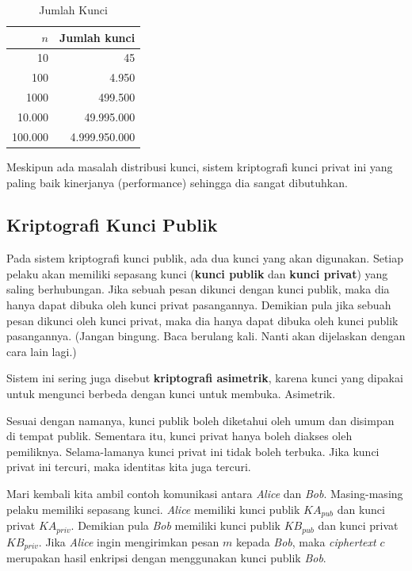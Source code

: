\begin{table}
   \centering
   \caption{Jumlah Kunci}
   \label{tbl:jumlahkunci}
\begin{tabular}{ r r }
   $n$ & Jumlah kunci \\
   \hline
  10 & 45 \\
  100 & 4.950 \\
  1000 & 499.500 \\
  10.000 & 49.995.000 \\
  100.000 & 4.999.950.000 \\
\end{tabular}
\end{table}

Meskipun ada masalah distribusi kunci, sistem kriptografi kunci privat ini yang
paling baik kinerjanya (performance) sehingga dia sangat dibutuhkan.


\subsection{Kriptografi Kunci Publik}
Pada sistem kriptografi kunci publik, ada dua kunci yang akan digunakan. Setiap
pelaku akan memiliki sepasang kunci ({\bf kunci publik} dan {\bf kunci privat})
yang saling berhubungan. Jika sebuah pesan dikunci dengan kunci publik, maka
dia hanya dapat dibuka oleh kunci privat pasangannya. Demikian pula jika sebuah
pesan dikunci oleh kunci privat, maka dia hanya dapat dibuka oleh kunci publik
pasangannya. (Jangan bingung. Baca berulang kali. Nanti akan dijelaskan dengan
cara lain lagi.)

Sistem ini sering juga disebut {\bf kriptografi asimetrik}, karena kunci yang
dipakai untuk mengunci berbeda dengan kunci untuk membuka. Asimetrik.

Sesuai dengan namanya, kunci publik boleh diketahui oleh umum dan disimpan di
tempat publik. Sementara itu, kunci privat hanya boleh diakses oleh pemiliknya.
Selama-lamanya kunci privat ini tidak boleh terbuka. Jika kunci privat ini
tercuri, maka identitas kita juga tercuri.

Mari kembali kita ambil contoh komunikasi antara {\em Alice} dan {\em Bob}.
Masing-masing pelaku memiliki sepasang kunci. {\em Alice} memiliki kunci publik
$KA_{pub}$ dan kunci privat $KA_{priv}$. Demikian pula {\em Bob} memiliki kunci
publik $KB_{pub}$ dan kunci privat $KB_{priv}$. Jika {\em Alice} ingin
mengirimkan pesan $m$ kepada {\em Bob}, maka {\em ciphertext} $c$ merupakan
hasil enkripsi dengan menggunakan kunci publik {\em Bob}.

